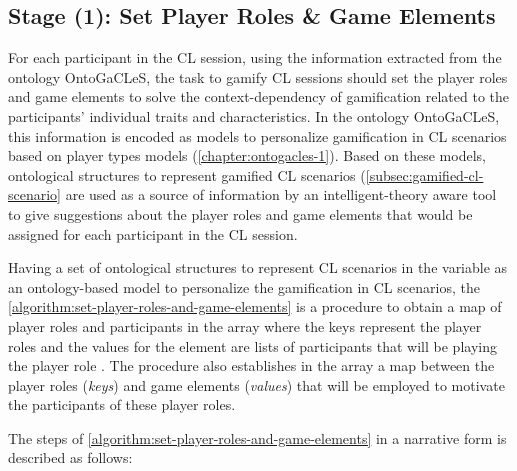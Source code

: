 \subsection{Stage (1): Set Player Roles \& Game Elements}

For each participant in the CL session, using the information extracted from the ontology OntoGaCLeS, the task to gamify CL sessions should set the player roles and game elements to solve the context-dependency of gamification related to the participants' individual traits and characteristics.
In the ontology OntoGaCLeS, this information is encoded as models to personalize gamification in CL scenarios based on player types models (\autoref{chapter:ontogacles-1}).
Based on these models, ontological structures to represent gamified CL scenarios (\autoref{subsec:gamified-cl-scenario} are used as a source of information by an intelligent-theory aware tool to give suggestions about the player roles and game elements that would be assigned for each participant in the CL session.

Having a set of ontological structures to represent CL scenarios in the variable  as an ontology-based model to personalize the gamification in CL scenarios, the \autoref{algorithm:set-player-roles-and-game-elements} is a procedure to obtain a map of player roles and participants in the array  where the keys represent the player roles and the values for the element  are lists of participants that will be playing the player role .
The procedure also establishes in the array  a map between the player roles (\emph{keys}) and game elements (\emph{values}) that will be employed to motivate the participants of these player roles.


The steps of \autoref{algorithm:set-player-roles-and-game-elements} in a narrative form is described as follows:

